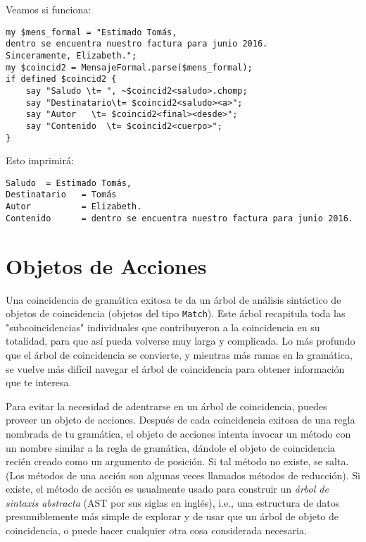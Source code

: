 Veamos si funciona:

\begin{lstlisting}
my $mens_formal = "Estimado Tomás,
dentro se encuentra nuestro factura para junio 2016.
Sinceramente, Elizabeth.";
my $coincid2 = MensajeFormal.parse($mens_formal);
if defined $coincid2 { 
    say "Saludo \t= ", ~$coincid2<saludo>.chomp;
    say "Destinatario\t= $coincid2<saludo><a>";
    say "Autor   \t= $coincid2<final><desde>";
    say "Contenido  \t= $coincid2<cuerpo>";
}
\end{lstlisting}

Esto imprimirá:

\begin{lstlisting}
Saludo 	= Estimado Tomás,
Destinatario   = Tomás
Autor          = Elizabeth.
Contenido      = dentro se encuentra nuestro factura para junio 2016.
\end{lstlisting}

\section{Objetos de Acciones}

\label{actions_object}

Una coincidencia de gramática exitosa te da un árbol de análisis
sintáctico de objetos de coincidencia (objetos del tipo \verb|Match|).
Este árbol recapitula toda las "subcoincidencias" individuales que
contribuyeron a la coincidencia en su totalidad, para que
así pueda volverse muy larga y complicada. Lo más profundo
que el árbol de coincidencia se convierte, y mientras más ramas en 
la gramática, se vuelve más difícil navegar el árbol de 
coincidencia para obtener información que te interesa.

Para evitar la necesidad de adentrarse en un árbol de coincidencia,
puedes proveer un objeto de acciones. Después de cada coincidencia
exitosa de una regla nombrada de tu gramática, el objeto de acciones
intenta invocar un método con un nombre similar a la regla de gramática,
dándole el objeto de coincidencia recién creado como un argumento de posición.
Si tal método no existe, se salta. (Los métodos de una acción son 
algunas veces llamados métodos de reducción). Si existe, 
el método de acción es usualmente usado para construir 
un \emph{árbol de sintaxis abstracta} (AST por sus siglas en inglés),
i.e., una estructura de datos presumiblemente más simple de 
explorar y de usar que un árbol de objeto de coincidencia, 
o puede hacer cualquier otra cosa considerada necesaria.

